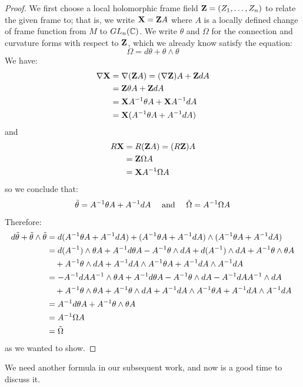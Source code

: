 \begin{proof}
%
We first choose a local holomorphic frame field $\mathbf{Z} = (Z_1, \ldots, Z_n)$ to relate the given frame to; that is, we write $\mathbf{X} = \mathbf{Z} A$ where $A$ is a locally defined change of frame function from $M$ to $GL_n (\mathbb{C})$.  We write $\theta$ and $\Omega$ for the connection and curvature forms with respect to $\mathbf{Z}$, which we already know satisfy the equation:
%
$$ \Omega = d \theta + \theta \wedge \theta $$
%
We have:
%
\begin{align*}
\nabla \mathbf{X} &= \nabla( \mathbf{Z} A ) = (\nabla \mathbf{Z}) A + \mathbf{Z} dA \\
&= \mathbf{Z} \theta A + \mathbf{Z} dA \\ 
&= \mathbf{X} A^{-1} \theta A + \mathbf{X} A^{-1} dA \\
&= \mathbf{X}( A^{-1} \theta A + A^{-1} dA )
\end{align*}
%
and
%
\begin{align*}
R \mathbf{X} &= R(\mathbf{Z} A) = (R \mathbf{Z})A \\
&= \mathbf{Z} \Omega A \\
&= \mathbf{X} A^{-1} \Omega A
\end{align*}
%
so we conclude that:
%
$$ \tilde{\theta} = A^{-1} \theta A + A^{-1} dA \quad \text{ and } \quad \tilde{\Omega} = A^{-1} \Omega A $$
%
Therefore:
%
\begin{align*}
%
d \thetasquig + \thetasquig \wedge \thetasquig &= d( A^{-1} \theta A + A^{-1} dA ) + (A^{-1} \theta A + A^{-1} dA) \wedge ( A^{-1} \theta A + A^{-1} dA )\\
%
&= d( A^{-1} ) \wedge \theta A + A^{-1} d \theta A - A^{-1} \theta \wedge dA + d ( A^{-1} ) \wedge dA + A^{-1} \theta \wedge \theta A \\
& \quad + A^{-1} \theta \wedge dA + A^{-1} dA \wedge A^{-1} \theta A + A^{-1} dA \wedge A^{-1} dA \\
%
&= - A^{-1} dA A^{-1} \wedge \theta A + A^{-1} d \theta A - A^{-1} \theta \wedge dA - A^{-1} dA A^{-1} \wedge dA \\
& \quad + A^{-1} \theta \wedge \theta A + A^{-1} \theta \wedge dA + A^{-1} dA \wedge A^{-1} \theta A + A^{-1} dA \wedge A^{-1} dA \\
%
&= A^{-1} d \theta A + A^{-1} \theta \wedge \theta A \\
&= A^{-1} \Omega A \\
&= \Omegasquig
%
\end{align*}
%
as we wanted to show.
%
\end{proof}

We need another formula in our subsequent work, and now is a good time to discuss it.

